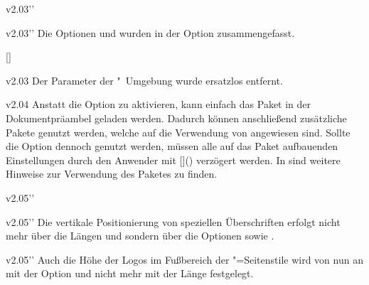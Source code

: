 \begin{Obsolete}{v2.03}{}''
\begin{Obsolete}{v2.03}{}''
\printdeclarationlist%
%
Die Optionen  und  wurden in der Option 
 zusammengefasst.
\end{Obsolete}
\end{Obsolete}

\begin{Declaration'}{[]}
\begin{Obsolete}{v2.03}{}
\printdeclarationlist%
%
Der Parameter  der 
"~Umgebung wurde ersatzlos entfernt.
\end{Obsolete}
\end{Declaration'}


%
\begin{Obsolete}{v2.04}{}%
\printdeclarationlist%
%
Anstatt die Option  zu aktivieren, kann einfach das Paket 
 in der Dokumentpräambel geladen werden. Dadurch können 
anschließend zusätzliche Pakete genutzt werden, welche auf die Verwendung von 
 angewiesen sind. Sollte die Option  
dennoch genutzt werden, müssen alle auf das Paket  
aufbauenden Einstellungen durch den Anwender mit %
[\MPValue{\dots}]() verzögert werden. In 
 sind weitere Hinweise zur Verwendung des Paketes 
 zu finden.
\end{Obsolete}


%
\begin{Obsolete}{v2.05}{}''
\begin{Obsolete}{v2.05}{}''
\printdeclarationlist%
%
Die vertikale Positionierung von speziellen Überschriften erfolgt nicht mehr 
über die Längen  und  sondern 
über die Optionen  sowie .
\end{Obsolete}
\end{Obsolete}


\begin{Obsolete}{v2.05}{}''
\printdeclarationlist%
%
Auch die Höhe der Logos im Fußbereich der "=Seitenstile 
wird von nun an mit der Option  und nicht mehr mit der 
Länge  festgelegt.
\end{Obsolete}


